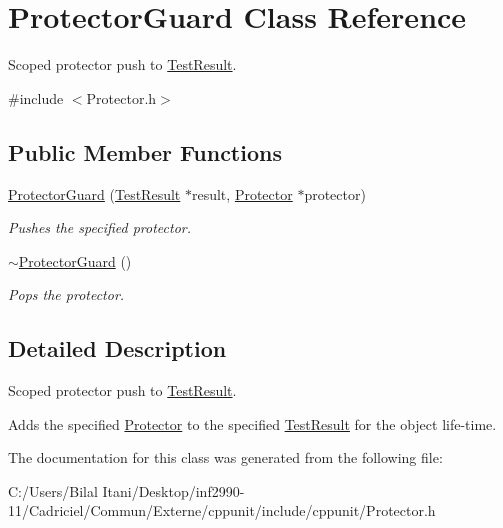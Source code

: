 \hypertarget{class_protector_guard}{}\section{Protector\+Guard Class Reference}
\label{class_protector_guard}


Scoped protector push to \hyperlink{class_test_result}{Test\+Result}.  




{\ttfamily \#include $<$Protector.\+h$>$}

\subsection*{Public Member Functions}
\begin{DoxyCompactItemize}
\item 
\hyperlink{class_protector_guard_abc4a3b2b51b6d93fb3dd9fed1bbc85db}{Protector\+Guard} (\hyperlink{class_test_result}{Test\+Result} $\ast$result, \hyperlink{class_protector}{Protector} $\ast$protector)\hypertarget{class_protector_guard_abc4a3b2b51b6d93fb3dd9fed1bbc85db}{}\label{class_protector_guard_abc4a3b2b51b6d93fb3dd9fed1bbc85db}

\begin{DoxyCompactList}\small\item\em Pushes the specified protector. \end{DoxyCompactList}\item 
\hyperlink{class_protector_guard_af80b574cc5999746e77ec13d2d0093f5}{$\sim$\+Protector\+Guard} ()\hypertarget{class_protector_guard_af80b574cc5999746e77ec13d2d0093f5}{}\label{class_protector_guard_af80b574cc5999746e77ec13d2d0093f5}

\begin{DoxyCompactList}\small\item\em Pops the protector. \end{DoxyCompactList}\end{DoxyCompactItemize}


\subsection{Detailed Description}
Scoped protector push to \hyperlink{class_test_result}{Test\+Result}. 

Adds the specified \hyperlink{class_protector}{Protector} to the specified \hyperlink{class_test_result}{Test\+Result} for the object life-\/time. 

The documentation for this class was generated from the following file\+:\begin{DoxyCompactItemize}
\item 
C\+:/\+Users/\+Bilal Itani/\+Desktop/inf2990-\/11/\+Cadriciel/\+Commun/\+Externe/cppunit/include/cppunit/Protector.\+h\end{DoxyCompactItemize}
